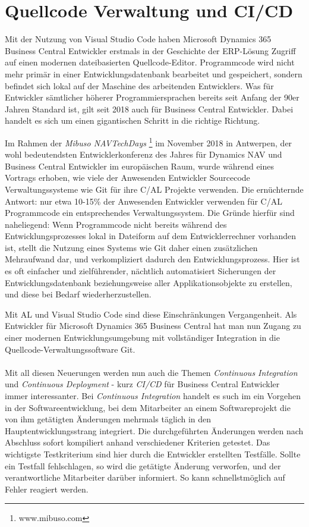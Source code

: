 \section{Quellcode Verwaltung und CI/CD}
Mit der Nutzung von Visual Studio Code haben Microsoft Dynamics 365 Business Central Entwickler erstmals in der Geschichte der ERP-Lösung Zugriff auf einen modernen dateibasierten Quellcode-Editor. Programmcode wird nicht mehr primär in einer Entwicklungsdatenbank bearbeitet und gespeichert, sondern befindet sich lokal auf der Maschine des arbeitenden Entwicklers. Was für Entwickler sämtlicher höherer Programmiersprachen bereits seit Anfang der 90er Jahren Standard ist, gilt seit 2018 auch für Business Central Entwickler. Dabei handelt es sich um einen gigantischen Schritt in die richtige Richtung. 

Im Rahmen der \textit{Mibuso NAVTechDays} \footnote{www.mibuso.com} im November 2018 in Antwerpen, der wohl bedeutendsten Entwicklerkonferenz des Jahres für Dynamics NAV und Business Central Entwickler im europäischen Raum, wurde während eines Vortrags erhoben, wie viele der Anwesenden Entwickler Sourcecode Verwaltungssysteme wie Git für ihre C/AL Projekte verwenden. Die ernüchternde Antwort: nur etwa 10-15\% der Anwesenden Entwickler verwenden für C/AL Programmcode ein entsprechendes Verwaltungssystem. Die Gründe hierfür sind naheliegend: Wenn Programmcode nicht bereits während des Entwicklungsprozesses lokal in Dateiform auf dem Entwicklerrechner vorhanden ist, stellt die Nutzung eines Systems wie Git daher einen zusätzlichen Mehraufwand dar, und verkompliziert dadurch den Entwicklungsprozess. Hier ist es oft einfacher und zielführender, nächtlich automatisiert Sicherungen der Entwicklungsdatenbank beziehungsweise aller Applikationsobjekte zu erstellen, und diese bei Bedarf wiederherzustellen.

Mit AL und Visual Studio Code sind diese Einschränkungen Vergangenheit. Als Entwickler für Microsoft Dynamics 365 Business Central hat man nun Zugang zu einer modernen Entwicklungsumgebung mit vollständiger Integration in die Quellcode-Verwaltungssoftware Git. 

\paragraph{}
Mit all diesen Neuerungen werden nun auch die Themen \textit{Continuous Integration} und \textit{Continuous Deployment} - kurz \textit{CI/CD} für Business Central Entwickler immer interessanter. Bei \textit{Continuous Integration} handelt es such im ein Vorgehen in der Softwareentwicklung, bei dem Mitarbeiter an einem Softwareprojekt die von ihm getätigten Änderungen mehrmals täglich in den Hauptentwicklungsstrang integriert\cite{fowler2006continuous}. Die durchgeführten Änderungen werden nach Abschluss sofort kompiliert anhand verschiedener Kriterien getestet. Das wichtigste Testkriterium sind hier durch die Entwickler erstellten Testfälle. Sollte ein Testfall fehlschlagen, so wird die getätigte Änderung verworfen, und der verantwortliche Mitarbeiter darüber informiert. So kann schnellstmöglich auf Fehler reagiert werden. 
 
